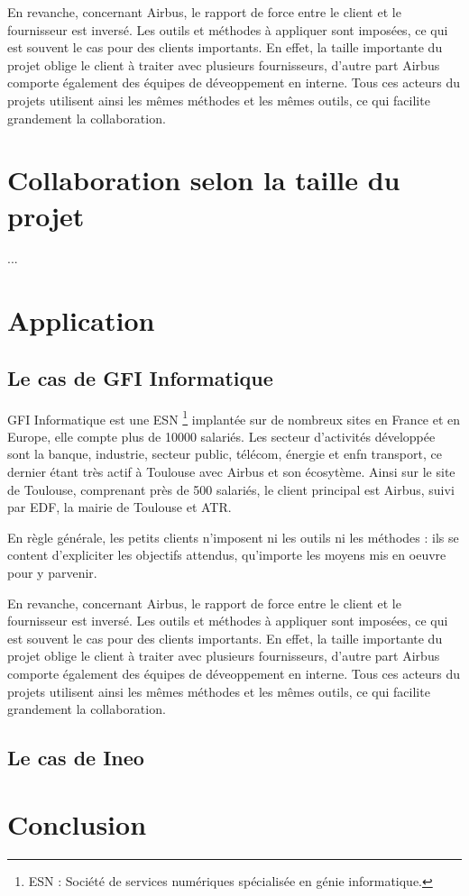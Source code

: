 \begin{app}
En revanche, concernant Airbus, le rapport de force entre le client et le fournisseur est inversé. Les outils et méthodes à appliquer sont imposées, ce qui est souvent le cas pour des clients importants. En effet, la taille importante du projet oblige le client à traiter avec plusieurs fournisseurs, d'autre part Airbus comporte également des équipes de déveoppement en interne. Tous ces acteurs du projets utilisent ainsi les mêmes méthodes et les mêmes outils, ce qui facilite grandement la collaboration.
\end{app}

\section{Collaboration selon la taille du projet}

...

\section{Application}

\subsection{Le cas de GFI Informatique}

GFI Informatique est une \gls{ESN} \footnote{ESN : Société de services numériques spécialisée en génie informatique.} implantée sur de nombreux sites en France et en Europe, elle compte plus de 10000 salariés. Les secteur d'activités développée sont la banque, industrie, secteur public, télécom, énergie et enfn transport, ce dernier étant très actif à Toulouse avec Airbus et son écosytème. Ainsi sur le site de Toulouse, comprenant près de 500 salariés, le client principal est Airbus, suivi par EDF, la mairie de Toulouse et ATR.

En règle générale, les petits clients n'imposent ni les outils ni les méthodes : ils se content d'expliciter les objectifs attendus, qu'importe les moyens mis en oeuvre pour y parvenir.

En revanche, concernant Airbus, le rapport de force entre le client et le fournisseur est inversé. Les outils et méthodes à appliquer sont imposées, ce qui est souvent le cas pour des clients importants. En effet, la taille importante du projet oblige le client à traiter avec plusieurs fournisseurs, d'autre part Airbus comporte également des équipes de déveoppement en interne. Tous ces acteurs du projets utilisent ainsi les mêmes méthodes et les mêmes outils, ce qui facilite grandement la collaboration.

\subsection{Le cas de Ineo}



\section{Conclusion}
